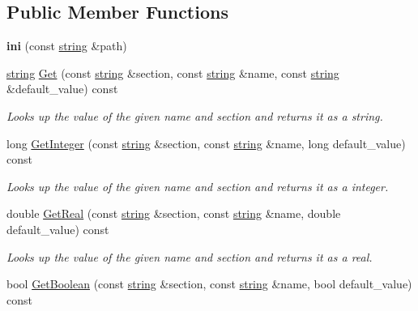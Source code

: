 \subsection*{Public Member Functions}
\begin{DoxyCompactItemize}
\item 
{\bfseries ini} (const \hyperlink{class_ensum_1_1string}{string} \&path)\hypertarget{class_ensum_1_1_file_handler_1_1ini_a966aac9f2602195dd3f9c8353061c191}{}\label{class_ensum_1_1_file_handler_1_1ini_a966aac9f2602195dd3f9c8353061c191}

\item 
\hyperlink{class_ensum_1_1string}{string} \hyperlink{class_ensum_1_1_file_handler_1_1ini_a794d0729d8ac92954dc6adcfdc10888c}{Get} (const \hyperlink{class_ensum_1_1string}{string} \&section, const \hyperlink{class_ensum_1_1string}{string} \&name, const \hyperlink{class_ensum_1_1string}{string} \&default\+\_\+value) const 
\begin{DoxyCompactList}\small\item\em Looks up the value of the given name and section and returns it as a string. \end{DoxyCompactList}\item 
long \hyperlink{class_ensum_1_1_file_handler_1_1ini_a53a1834bf3a13d38c166e417ac1d2973}{Get\+Integer} (const \hyperlink{class_ensum_1_1string}{string} \&section, const \hyperlink{class_ensum_1_1string}{string} \&name, long default\+\_\+value) const 
\begin{DoxyCompactList}\small\item\em Looks up the value of the given name and section and returns it as a integer. \end{DoxyCompactList}\item 
double \hyperlink{class_ensum_1_1_file_handler_1_1ini_af0f24b8866a8c16c6b09d6f707a676b7}{Get\+Real} (const \hyperlink{class_ensum_1_1string}{string} \&section, const \hyperlink{class_ensum_1_1string}{string} \&name, double default\+\_\+value) const 
\begin{DoxyCompactList}\small\item\em Looks up the value of the given name and section and returns it as a real. \end{DoxyCompactList}\item 
bool \hyperlink{class_ensum_1_1_file_handler_1_1ini_a8a2d73e88459187df0c5b9d2880a08eb}{Get\+Boolean} (const \hyperlink{class_ensum_1_1string}{string} \&section, const \hyperlink{class_ensum_1_1string}{string} \&name, bool default\+\_\+value) const 

\end{DoxyCompactItemize}
